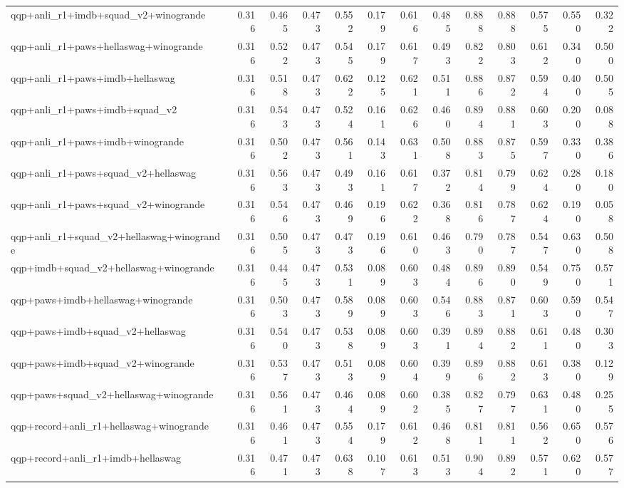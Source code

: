 \begin{table}[t]
\begin{tabular}{lrrrrrrrrrrrr}
    qqp+anli\_r1+imdb+squad\_v2+winogrande & 0.316 & 0.465 & 0.473 & 0.552 & 0.179 & 0.616 & 0.485 & 0.888 & 0.888 & 0.575 & 0.550 & 0.322 \\
    qqp+anli\_r1+paws+hellaswag+winogrande & 0.316 & 0.522 & 0.473 & 0.545 & 0.179 & 0.617 & 0.493 & 0.822 & 0.803 & 0.612 & 0.340 & 0.500 \\
    qqp+anli\_r1+paws+imdb+hellaswag & 0.316 & 0.518 & 0.473 & 0.622 & 0.125 & 0.621 & 0.511 & 0.886 & 0.872 & 0.594 & 0.400 & 0.505 \\
    qqp+anli\_r1+paws+imdb+squad\_v2 & 0.316 & 0.543 & 0.473 & 0.524 & 0.161 & 0.626 & 0.460 & 0.894 & 0.881 & 0.603 & 0.200 & 0.088 \\
    qqp+anli\_r1+paws+imdb+winogrande & 0.316 & 0.502 & 0.473 & 0.561 & 0.143 & 0.631 & 0.508 & 0.883 & 0.875 & 0.597 & 0.330 & 0.386 \\
    qqp+anli\_r1+paws+squad\_v2+hellaswag & 0.316 & 0.563 & 0.473 & 0.493 & 0.161 & 0.617 & 0.372 & 0.814 & 0.799 & 0.624 & 0.280 & 0.180 \\
    qqp+anli\_r1+paws+squad\_v2+winogrande & 0.316 & 0.546 & 0.473 & 0.469 & 0.196 & 0.622 & 0.368 & 0.816 & 0.787 & 0.624 & 0.190 & 0.058 \\
    qqp+anli\_r1+squad\_v2+hellaswag+winogrande & 0.316 & 0.505 & 0.473 & 0.473 & 0.196 & 0.610 & 0.463 & 0.790 & 0.787 & 0.547 & 0.630 & 0.508 \\
    qqp+imdb+squad\_v2+hellaswag+winogrande & 0.316 & 0.445 & 0.473 & 0.531 & 0.089 & 0.603 & 0.484 & 0.896 & 0.890 & 0.549 & 0.750 & 0.571 \\
    qqp+paws+imdb+hellaswag+winogrande & 0.316 & 0.503 & 0.473 & 0.589 & 0.089 & 0.603 & 0.546 & 0.883 & 0.871 & 0.603 & 0.590 & 0.547 \\
    qqp+paws+imdb+squad\_v2+hellaswag & 0.316 & 0.540 & 0.473 & 0.538 & 0.089 & 0.603 & 0.391 & 0.894 & 0.882 & 0.611 & 0.480 & 0.303 \\
    qqp+paws+imdb+squad\_v2+winogrande & 0.316 & 0.537 & 0.473 & 0.513 & 0.089 & 0.604 & 0.399 & 0.896 & 0.882 & 0.613 & 0.380 & 0.129 \\
    qqp+paws+squad\_v2+hellaswag+winogrande & 0.316 & 0.561 & 0.473 & 0.464 & 0.089 & 0.602 & 0.385 & 0.827 & 0.797 & 0.631 & 0.480 & 0.255 \\
    qqp+record+anli\_r1+hellaswag+winogrande & 0.316 & 0.461 & 0.473 & 0.554 & 0.179 & 0.612 & 0.468 & 0.811 & 0.811 & 0.562 & 0.650 & 0.576 \\
    qqp+record+anli\_r1+imdb+hellaswag & 0.316 & 0.471 & 0.473 & 0.638 & 0.107 & 0.613 & 0.513 & 0.904 & 0.892 & 0.571 & 0.620 & 0.577 \\

\end{tabular}
\end{table}
